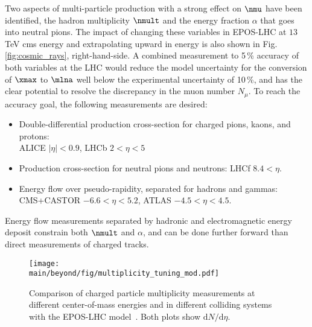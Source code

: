 \documentclass[../report.tex]{subfiles}
\providecommand{\main}{..}
\begin{document}


Two aspects of multi-particle production with a strong effect on $\nmu$ have been identified\cite{Ulrich:2010rg}, the hadron multiplicity $\nmult$ and the energy fraction $\alpha$ that goes into neutral pions. The impact of changing these variables in EPOS-LHC at $13$\,TeV cms energy and extrapolating upward in energy is also shown in Fig.\ref{fig:cosmic_rays}, right-hand-side. A combined measurement to 5\,\% accuracy of both variables at the LHC would reduce the model uncertainty for the conversion of $\xmax$ to $\mlna$ well below the experimental uncertainty of 10\,\%, and has the clear potential to resolve the discrepancy in the muon number $N_\mu$. To reach the accuracy goal, the following measurements are desired:
\begin{itemize}
\item Double-differential production cross-section for charged pions, kaons, and protons: \\ ALICE $|\eta| < 0.9$, LHCb $2 < \eta < 5$
\item Production cross-section for neutral pions and neutrons: LHCf $8.4 < \eta$.
\item Energy flow over pseudo-rapidity, separated for hadrons and gammas:\\ CMS+CASTOR $-6.6 < \eta < 5.2$, ATLAS $-4.5 < \eta < 4.5$.
\end{itemize}
Energy flow measurements separated by hadronic and electromagnetic energy deposit constrain both $\nmult$ and $\alpha$, and can be done further forward than direct measurements of charged tracks.

\begin{figure}
\texttt{[image: \\main/beyond/fig/multiplicity\_tuning\_mod.pdf]}
\caption{Comparison of charged particle multiplicity measurements at different center-of-mass energies and in different colliding systems with the EPOS-LHC model~\cite{Kim:2018ink}. Both plots show $\text{d} N/\text{d}\eta$.}
\label{fig:multiplicity_tuning}
\end{figure}
\end{document}
